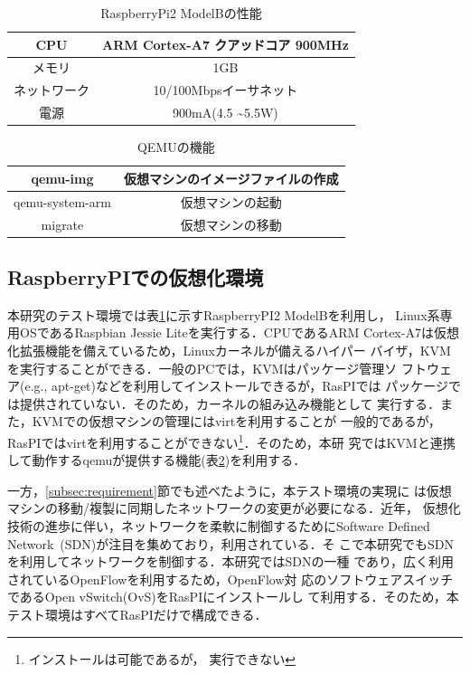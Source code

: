 \documentclass[submit,techrep]{ipsj}
\begin{document}
\begin{table}[tb]
	\centering
	\caption{RaspberryPi2 ModelBの性能}
	\label{tab:rpi2}
	{
		\small
		\begin{tabular}{|c|c|} \hline
		CPU & ARM Cortex-A7 クアッドコア 900MHz\\ \hline
		メモリ & 1GB\\ \hline
		ネットワーク & 10/100Mbpsイーサネット\\ \hline
		電源 & 900mA(4.5 \textasciitilde 5.5W)\\ \hline
		\end{tabular}
	}
\end{table}

\begin{table}[tb]
	\centering
	\caption{QEMUの機能}
	\label{tab:qemu_func}
	{
		\small
		\begin{tabular}{|c|c|} \hline
		qemu-img & 仮想マシンのイメージファイルの作成\\ \hline
		qemu-system-arm & 仮想マシンの起動\\ \hline
		migrate & 仮想マシンの移動\\ \hline
		\end{tabular}
	}
\end{table}

\subsection{RaspberryPIでの仮想化環境}
本研究のテスト環境では表\ref{tab:rpi2}に示すRaspberryPI2 ModelBを利用し，
Linux系専用OSであるRaspbian Jessie Lite\cite{raspbian}を実行する．CPUであるARM
Cortex-A7は仮想化拡張機能を備えているため，Linuxカーネルが備えるハイパー
バイザ，KVMを実行することができる．一般のPCでは，KVMはパッケージ管理ソ
フトウェア(e.g., apt-get)などを利用してインストールできるが，RasPIでは
パッケージでは提供されていない．そのため，カーネルの組み込み機能として
実行する．また，KVMでの仮想マシンの管理にはvirt\cite{virt}を利用することが
一般的であるが，RasPIではvirtを利用することができない\footnote{インストールは可能であるが，
実行できない}．そのため，本研
究ではKVMと連携して動作するqemu\cite{qemu}が提供する機能(表\ref{tab:qemu_func})を利用する．

一方，\ref{subsec:requirement}節でも述べたように，本テスト環境の実現に
は仮想マシンの移動/複製に同期したネットワークの変更が必要になる．近年，
仮想化技術の進歩に伴い，ネットワークを柔軟に制御するためにSoftware
Defined Network~(SDN)\cite{sdn}が注目を集めており，利用されている．そ
こで本研究でもSDNを利用してネットワークを制御する．本研究ではSDNの一種
であり，広く利用されているOpenFlow\cite{opf}を利用するため，OpenFlow対
応のソフトウェアスイッチであるOpen vSwitch(OvS)をRasPIにインストールし
て利用する．そのため，本テスト環境はすべてRasPIだけで構成できる．
\end{document}
